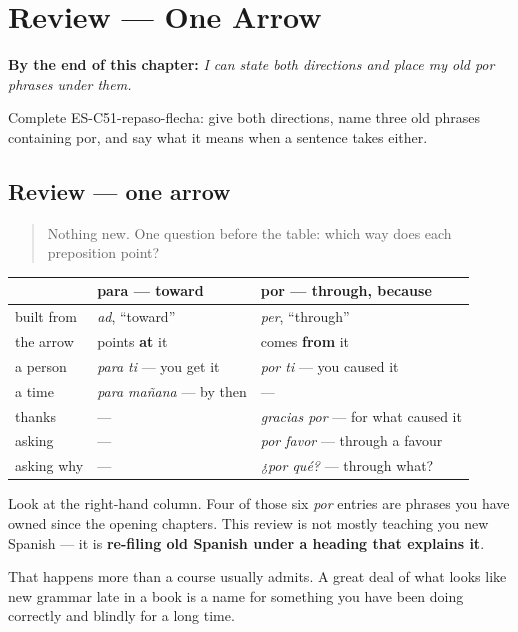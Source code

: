 
\chapter{Review --- One Arrow}
\label{ch:review-por-para}

\begin{chapteropening}
\textbf{By the end of this chapter:} \emph{I can state both directions and place my old por phrases under them.}

Complete ES-C51-repaso-flecha: give both directions, name three old phrases containing por, and say what it means when a sentence takes either.
\end{chapteropening}

\section[Practice]{Review — one arrow}

\label{lesson:ES-C51-repaso-flecha}



\begin{quote}
Nothing new. One question before the table: which way does each preposition point?
\end{quote}

\begin{grammarlens}[title={What you've built}]
\noindent
\begin{tabularx}{\linewidth}{@{}>{\raggedright\arraybackslash}X>{\raggedright\arraybackslash}X>{\raggedright\arraybackslash}X@{}}
\toprule
\textbf{} & \textbf{\textbf{para} — toward} & \textbf{\textbf{por} — through, because} \\
\midrule
built from & \emph{ad}, \textquotedblleft{}toward\textquotedblright{} & \emph{per}, \textquotedblleft{}through\textquotedblright{} \\
the arrow & points \textbf{at} it & comes \textbf{from} it \\
a person & \emph{para ti} — you get it & \emph{por ti} — you caused it \\
a time & \emph{para mañana} — by then & — \\
thanks & — & \emph{gracias por} — for what caused it \\
asking & — & \emph{por favor} — through a favour \\
asking why & — & \emph{¿por qué?} — through what? \\
\bottomrule
\end{tabularx}

Look at the right-hand column. Four of those six \emph{por} entries are phrases you have owned since the opening chapters. This review is not mostly teaching you new Spanish — it is \textbf{re-filing old Spanish under a heading that explains it}.

That happens more than a course usually admits. A great deal of what looks like new grammar late in a book is a name for something you have been doing correctly and blindly for a long time.
\end{grammarlens}

